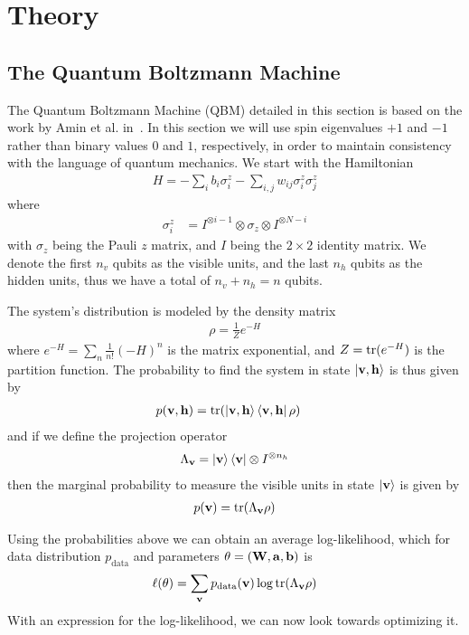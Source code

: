 \section{Theory}
\subsection{The Quantum Boltzmann Machine}
The Quantum Boltzmann Machine (QBM) detailed in this section is based on the work by Amin et al. in~\cite{amin_2018}.
In this section we will use spin eigenvalues \( +1 \) and \( -1 \) rather than binary values \( 0 \) and \( 1 \), respectively, in order to maintain consistency with the language of quantum mechanics.
We start with the Hamiltonian
\begin{align}
    H = -\sum_i b_i \sigma_i^z - \sum_{i,j} w_{ij} \sigma_i^z \sigma_j^z
\end{align}
where
\begin{align}
    \sigma_i^z
        &= I^{\otimes i-1} \otimes \sigma_z \otimes I^{\otimes N-i}
\end{align}
with \( \sigma_z \) being the Pauli \( z \) matrix, and \( I \) being the \( 2 \times 2 \) identity matrix.
We denote the first \( n_v \) qubits as the visible units, and the last \( n_h \) qubits as the hidden units, thus we have a total of \( n_v + n_h = n \) qubits.

The system's distribution is modeled by the density matrix
\begin{align}
    \rho = \frac{1}{Z} e^{-H}
\end{align}
where \( e^{-H} = \sum_n \frac{1}{n!} (-H)^n \) is the matrix exponential, and \( Z = \text{tr}(e^{-H}) \) is the partition function.
The probability to find the system in state \( \ket{\mathbf{v},\mathbf{h}} \) is thus given by
\begin{align}
    p(\mathbf{v},\mathbf{h})
        &= \text{tr}(\ket{\mathbf{v},\mathbf{h}}\bra{\mathbf{v},\mathbf{h}} \rho)
\end{align}
and if we define the projection operator
\begin{align}
    \Lambda_{\mathbf{v}} = \ket{\mathbf{v}}\bra{\mathbf{v}} \otimes I^{\otimes n_h}
\end{align}
then the marginal probability to measure the visible units in state \( \ket{\mathbf{v}} \) is given by
\begin{align}
    p(\mathbf{v}) = \text{tr}(\Lambda_{\mathbf{v}}\rho)
\end{align}

Using the probabilities above we can obtain an average log-likelihood, which for data distribution \( p_\text{data} \) and parameters \( \theta = (\mathbf{W}, \mathbf{a}, \mathbf{b}) \) is
\begin{align}
    \ell(\theta) = \sum_{\mathbf{v}} p_{\text{data}}(\mathbf{v}) \log \text{tr}(\Lambda_{\mathbf{v}}\rho)
\end{align}
With an expression for the log-likelihood, we can now look towards optimizing it.

